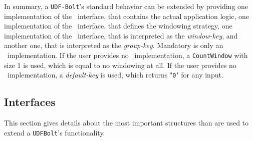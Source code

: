 In summary, a \texttt{UDF-Bolt}'s standard behavior can be extended by providing one implementation of the \ioperator\ interface, that contains the actual application logic, one implementation of the \iwindow\ interface, that defines the windowing strategy, one implementation of the \ikeyconfig\ interface, that is interpreted as the \textsl{window-key}, and another one, that is interpreted as the \textsl{group-key}. Mandatory is only an \ioperator\ implementation. If the user provides no \iwindow\ implementation, a \texttt{CountWindow} with size 1 is used, which is equal to no windowing at all. If the user provides no \ikeyconfig\ implementation, a \textsl{default-key} is used, which returns "\texttt{0}" for any input.

\subsection{Interfaces}
\label{sect:interfaces}
This section gives details about the most important structures than are used to extend a \texttt{UDFBolt}'s functionality.
